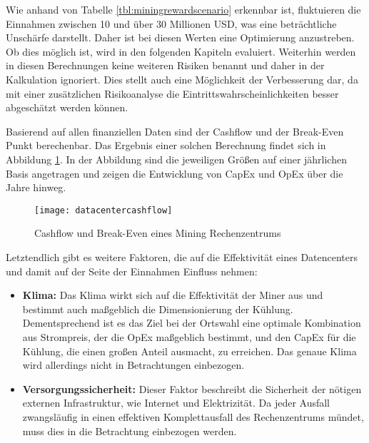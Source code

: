 Wie anhand von Tabelle \ref{tbl:miningrewardscenario} erkennbar ist, fluktuieren die Einnahmen zwischen 10 und über
30 Millionen \ac{USD}, was eine beträchtliche Unschärfe darstellt. Daher ist bei diesen Werten eine Optimierung anzustreben.
Ob dies möglich ist, wird in den folgenden Kapiteln evaluiert. Weiterhin werden in diesen Berechnungen keine weiteren
Risiken benannt und daher in der Kalkulation ignoriert. Dies stellt auch eine Möglichkeit der Verbesserung dar,
da mit einer zusätzlichen Risikoanalyse die Eintrittswahrscheinlichkeiten besser abgeschätzt werden können.

Basierend auf allen finanziellen Daten sind der Cashflow und der Break-Even Punkt berechenbar. Das Ergebnis einer
solchen Berechnung findet sich in Abbildung \ref{figure:datacentercashflow}. In der Abbildung sind die jeweiligen Größen
auf einer jährlichen Basis angetragen und zeigen die Entwicklung von \ac{CapEx} und \ac{OpEx} über die Jahre hinweg.

\begin{figure}[H]
    \caption{Cashflow und Break-Even eines Mining Rechenzentrums}
    \texttt{[image: datacentercashflow]}
    \label{figure:datacentercashflow}
    \\
    \cite[Quelle: ][]{appendix:summaryofinvestment}
\end{figure}

Letztendlich gibt es weitere Faktoren, die auf die Effektivität eines Datencenters und damit auf der Seite der
Einnahmen Einfluss nehmen:
\begin{itemize}
    \item \textbf{Klima: }Das Klima wirkt sich auf die Effektivität der Miner aus und bestimmt auch maßgeblich
    die Dimensionierung der Kühlung. Dementsprechend ist es das Ziel bei der Ortswahl eine optimale Kombination aus
    Strompreis, der die \ac{OpEx} maßgeblich bestimmt, und den \ac{CapEx} für die Kühlung, die einen
    großen Anteil ausmacht, zu erreichen. Das genaue Klima wird allerdings nicht in Betrachtungen einbezogen.
    \item \textbf{Versorgungssicherheit: }Dieser Faktor beschreibt die Sicherheit der nötigen externen Infrastruktur,
    wie Internet und Elektrizität. Da jeder Ausfall zwangsläufig in einen effektiven Komplettausfall des Rechenzentrums
    mündet, muss dies in die Betrachtung einbezogen werden.
\end{itemize}
